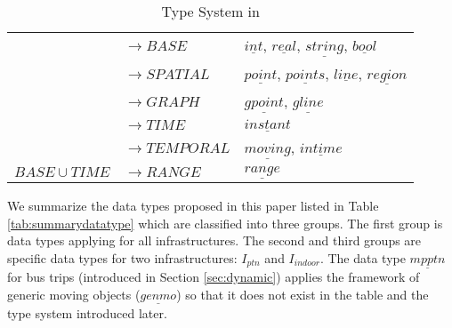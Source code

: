 \begin{table}[ht]
 \begin{center} 
  \begin{tabular}{c|l|l}
	\hline
	\multirow{5}{*}{}&$\rightarrow BASE$&$\underline{int}$, $\underline{real}$, $\underline{string}$, $\underline{bool}$ \\
	& $\rightarrow SPATIAL$& $\underline{point}$, $\underline{points}$, $\underline{line}$, $\underline{region}$\\
	& $\rightarrow GRAPH$& $\underline{gpoint}$, $\underline{gline}$\\
	& $\rightarrow TIME$& $\underline{instant}$\\
	\hline
	$BASE\cup SPATIAL \cup GRAPH$&$\rightarrow TEMPORAL$&$\underline{moving}$, $\underline{intime}$\\
	\hline
	$BASE\cup TIME$&$\rightarrow RANGE$&$\underline{range}$\\
	\hline
  \end{tabular}
 \end{center}
 \caption{\label{tab:typesystem2}Type System in \cite{GA2006}}
\end{table}

We summarize the data types proposed in this paper listed in Table \ref{tab:summarydatatype} which are classified into three groups. The first group is data types applying for all infrastructures. The second and third groups are specific data types for two infrastructures:
$I_{ptn}$ and $I_{indoor}$. The data type $\underline{mpptn}$ for bus trips (introduced in Section \ref{sec:dynamic}) applies the framework of generic moving objects ($\underline{genmo}$) so that it does not exist in the table and the type system introduced later.\\

